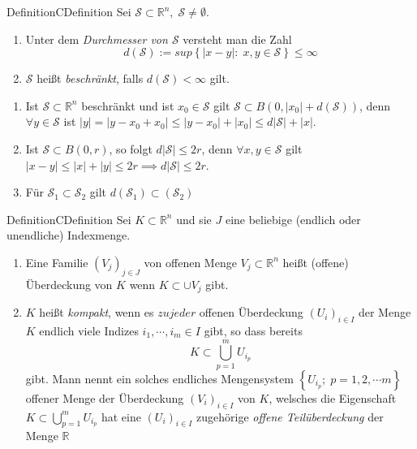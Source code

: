 \documentclass[11.5 pt, a4paper]{memoir}
\begin{document}

\begin{ibox}[]{Definition}{CDefinition}
    Sei $ \mathcal{S} \subset \mathbb{R}^n , \; \mathcal{S} \neq \emptyset. $ 
	\begin{enumerate}[label=\alph*)]
		\item Unter dem \textit{Durchmesser von $ \mathcal{S}  $ } versteht man die Zahl 
			$$ d \left( \mathcal{S}  \right) := sup \left\{ \left| x-y \right| : \; x,y \in \mathcal{S}  \right\} \leq \infty $$
		\item $ \mathcal{S}  $ heißt \textit{beschränkt}, falls $ d \left( \mathcal{S}  \right) < \infty $ gilt.
	\end{enumerate}
\end{ibox}

\begin{enumerate}[label=\alph*)]
	\item Ist $ \mathcal{S} \subset  \mathbb{R}^n  $ beschränkt und ist $ x_0 \in \mathcal{S}  $   gilt $ \mathcal{S} \subset 
		B \left( 0, \left| x_0 \right| + d( \mathcal{S} ) \right)  $, denn $ \forall  y \in \mathcal{S}  $ ist $ |y| = 
		\left| y -x_0 + x_0 \right| \leq \left| y-x_0 \right| + \left| x_0 \right| \leq d \left| \mathcal{S}  \right| + |x|$. 
	\item Ist $ \mathcal{S} \subset B(0,r) $, so folgt $  d \left| \mathcal{S}  \right| \leq 2r $, denn $ \forall x,y \in \mathcal{S}  $ 
		gilt $ \left| x-y \right| \leq |x| + |y| \leq 2r \implies  d \left| \mathcal{S}  \right| \leq 2r $.
	\item Für $ \mathcal{S}_1 \subset \mathcal{S}_2 $ gilt $d \left(  \mathcal{S}_1 \right)  \subset \left(  \mathcal{S}_2 \right) $ 
\end{enumerate}

\begin{ibox}[]{Definition}{CDefinition}
    Sei $ K \subset  \mathbb{R}^n  $ und sie $ J $ eine beliebige (endlich oder unendliche) Indexmenge.
	\begin{enumerate}[label=\alph*)]
		\item Eine Familie $ \left( V_j \right)_{j \in J} $ von offenen Menge $ V_{j} \subset  \mathbb{R}^n  $ heißt (offene)
			Überdeckung von $ K $ wenn $ K \subset  \cup V_{j}$ gibt.
		\item $ K $ heißt \textit{kompakt}, wenn es $ zu jeder $ offenen Überdeckung $ \left( U_{i} \right)_{i \in  I} $ der Menge
			$ K $ endlich viele Indizes $ i_1, \cdots , i_{m} \in  I $ gibt, so dass bereits 
			$$ K \subset  \bigcup_{p = 1}^{m} U_{i_{p}}  $$gibt. Mann nennt ein solches endliches Mengensystem 
			$ \left\{ U_{i_{p}}; \; p = 1,2, \cdots m \right\}  $ offener Menge der Überdeckung $ \left( V_{i} \right)_{i \in  I} $ 
			von $ K $, welsches die Eigenschaft $  K \subset  \bigcup_{p = 1}^{m} U_{i_{p}} $ hat eine $ \left( U_{i}\right)_{i \in  I}   $ 
			zugehörige \textit{offene Teilüberdeckung} der Menge $ \mathbb{R}  $ 
	\end{enumerate}
\end{ibox}
\end{document}
